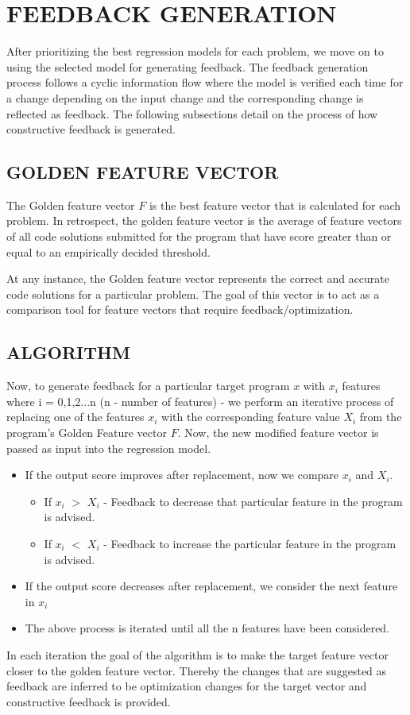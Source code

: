 
\chapter{FEEDBACK GENERATION}

After prioritizing the best regression models for each problem, we move on to using the selected model for generating feedback. The feedback generation process follows a cyclic information flow where the model is verified each time for a change depending on the input change and the corresponding change is reflected as feedback. The following subsections detail on the process of how constructive feedback is generated. 

\section{GOLDEN FEATURE VECTOR}

The Golden feature vector $F$ is the best feature vector that is calculated for each problem. In retrospect, the golden feature vector is the average of feature vectors of all code solutions submitted for the program that have score greater than or equal to an empirically decided threshold. 

At any instance, the Golden feature vector represents the correct and accurate code solutions for a particular problem. The goal of this vector is to act as a comparison tool for feature vectors that require feedback/optimization. 

\section{ALGORITHM}

Now, to generate feedback for a particular target program $x$ with $x_{i}$ features where i = 0,1,2...n (n - number of features) - we perform an iterative process of replacing one of the features $x_{i}$ with the corresponding feature value $X_{i}$ from the program's Golden Feature vector $F$. Now, the new modified feature vector is passed as input into the regression model. 

\begin{itemize}

    \item If the output score improves after replacement, now we compare $x_{i}$ and $X_{i}$.

        \begin{itemize}
                \item If $x_{i}$ $>$ $X_{i}$ - Feedback to decrease that particular feature in the program is advised. 
                \item If $x_{i}$ $<$ $X_{i}$ - Feedback to increase the particular feature in the program is advised.
        \end{itemize}
        
    \item If the output score decreases after replacement, we consider the next feature in $x_{i}$
    
    \item The above process is iterated until all the n features have been considered. 

\end{itemize}

In each iteration the goal of the algorithm is to make the target feature vector closer to the golden feature vector. Thereby the changes that are suggested as feedback are inferred to be optimization changes for the target vector and constructive feedback is provided. 
